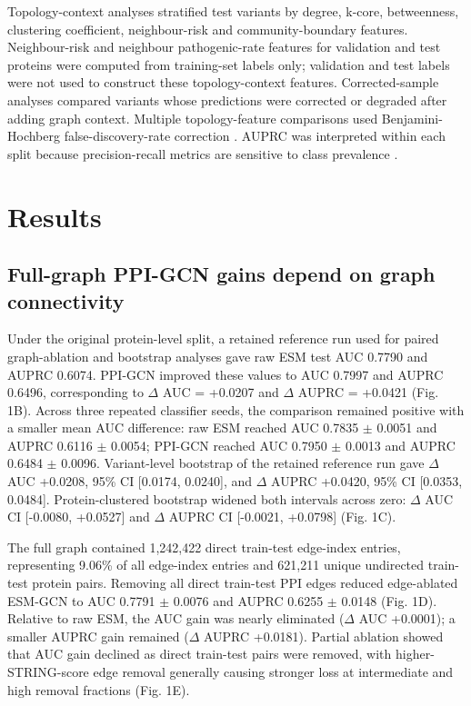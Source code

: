 \documentclass[conference]{IEEEtran}
\begin{document}
Topology-context analyses stratified test variants by degree, k-core, betweenness, clustering coefficient, neighbour-risk and community-boundary features. Neighbour-risk and neighbour pathogenic-rate features for validation and test proteins were computed from training-set labels only; validation and test labels were not used to construct these topology-context features. Corrected-sample analyses compared variants whose predictions were corrected or degraded after adding graph context. Multiple topology-feature comparisons used Benjamini-Hochberg false-discovery-rate correction \cite{Benjamini1995FDR}. AUPRC was interpreted within each split because precision-recall metrics are sensitive to class prevalence \cite{Saito2015PrecisionRecall}.

\section{Results}

\subsection{Full-graph PPI-GCN gains depend on graph connectivity}

Under the original protein-level split, a retained reference run used for paired graph-ablation and bootstrap analyses gave raw ESM test AUC 0.7790 and AUPRC 0.6074. PPI-GCN improved these values to AUC 0.7997 and AUPRC 0.6496, corresponding to $\Delta$ AUC = +0.0207 and $\Delta$ AUPRC = +0.0421 (Fig. 1B). Across three repeated classifier seeds, the comparison remained positive with a smaller mean AUC difference: raw ESM reached AUC 0.7835 $\pm$ 0.0051 and AUPRC 0.6116 $\pm$ 0.0054; PPI-GCN reached AUC 0.7950 $\pm$ 0.0013 and AUPRC 0.6484 $\pm$ 0.0096. Variant-level bootstrap of the retained reference run gave $\Delta$ AUC +0.0208, 95\% CI [0.0174, 0.0240], and $\Delta$ AUPRC +0.0420, 95\% CI [0.0353, 0.0484]. Protein-clustered bootstrap widened both intervals across zero: $\Delta$ AUC CI [-0.0080, +0.0527] and $\Delta$ AUPRC CI [-0.0021, +0.0798] (Fig. 1C).

The full graph contained 1,242,422 direct train-test edge-index entries, representing 9.06\% of all edge-index entries and 621,211 unique undirected train-test protein pairs. Removing all direct train-test PPI edges reduced edge-ablated ESM-GCN to AUC 0.7791 $\pm$ 0.0076 and AUPRC 0.6255 $\pm$ 0.0148 (Fig. 1D). Relative to raw ESM, the AUC gain was nearly eliminated ($\Delta$ AUC +0.0001); a smaller AUPRC gain remained ($\Delta$ AUPRC +0.0181). Partial ablation showed that AUC gain declined as direct train-test pairs were removed, with higher-STRING-score edge removal generally causing stronger loss at intermediate and high removal fractions (Fig. 1E).
\end{document}
